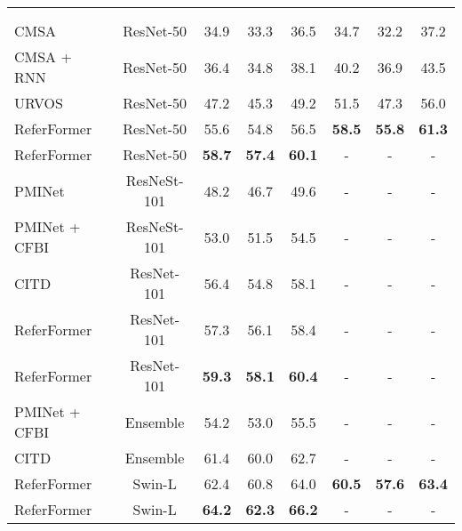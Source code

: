 \documentclass[10pt,twocolumn,letterpaper]{article}
\begin{document}
{\begin{table*}[t]
\begin{center}
\begin{tabular}{l | c | c c c | c c c}
 & &  &  &  & 
      &  &  \\

\arrayrulecolor{white}\hline
\arrayrulecolor{black}\hline
\arrayrulecolor{white}\hline

\multicolumn{8}{l}{\textbf{Spatial Visual Backbones}} \\


\arrayrulecolor{white}\hline
\arrayrulecolor{black}\hline
\arrayrulecolor{white}\hline

CMSA ~\cite{ye2019cmsa} & ResNet-50 & 34.9 & 33.3 & 36.5 & 34.7 & 32.2 & 37.2 \\
CMSA + RNN ~\cite{ye2019cmsa}  & ResNet-50 & 36.4 & 34.8 & 38.1 & 40.2 & 36.9 & 43.5 \\ 
URVOS ~\cite{seo2020urvos} & ResNet-50 & 47.2 & 45.3 & 49.2 & 51.5 & 47.3 & 56.0 \\
ReferFormer & ResNet-50 & 55.6 & 54.8 & 56.5 & \textbf{58.5} & \textbf{55.8} & \textbf{61.3} \\
ReferFormer & ResNet-50 & \textbf{58.7} & \textbf{57.4} & \textbf{60.1} & - & - & - \\

\arrayrulecolor{white}\hline
\arrayrulecolor{black}\hline
\arrayrulecolor{white}\hline

PMINet ~\cite{ding2021pminet} & ResNeSt-101 & 48.2 & 46.7 & 49.6 & - & - & - \\
PMINet + CFBI ~\cite{ding2021pminet} & ResNeSt-101 & 53.0 & 51.5 & 54.5 & - & - & - \\
CITD ~\cite{liang2021topdown} & ResNet-101 & 56.4 & 54.8 & 58.1 & - & - & - \\
ReferFormer & ResNet-101 & 57.3 & 56.1 & 58.4 & - & - & - \\
ReferFormer & ResNet-101 & \textbf{59.3} & \textbf{58.1} & \textbf{60.4} & - & - & -  \\          

\arrayrulecolor{white}\hline
\arrayrulecolor{black}\hline
\arrayrulecolor{white}\hline

PMINet + CFBI ~\cite{ding2021pminet} & Ensemble & 54.2 & 53.0 & 55.5 & - & - & - \\
CITD ~\cite{liang2021topdown} & Ensemble & 61.4 & 60.0 & 62.7 & - & - & - \\
ReferFormer & Swin-L & 62.4 & 60.8 & 64.0 & \textbf{60.5} & \textbf{57.6} & \textbf{63.4} \\
ReferFormer & Swin-L & \textbf{64.2} & \textbf{62.3} & \textbf{66.2} & - & - & - \\     
 


\end{tabular}
\end{center}
\end{table*}}
\end{document}
